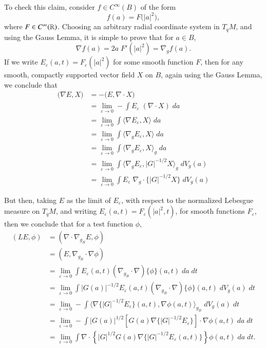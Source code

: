 To check this claim, consider $f \in C^\infty(B)$ of the form
%
\[ f(a) = F \Big( |a|^2 \Big), \]
%
where $F \in C^\infty(\operatorname{\mathbb{R}})$. Choosing an arbitrary radial coordinate system in $T_q M$, and using the Gauss Lemma, it is simple to prove that for $a \in B$,
%
\[ \nabla f(a) = 2a\; F'(|a|^2) = \nabla_g f(a). \]
%
If we write $E_\varepsilon(a,t) = F_\varepsilon(|a|^2)$ for some smooth function $F$, then for any smooth, compactly supported vector field $X$ on $B$, again using the Gauss Lemma, we conclude that
%
\begin{align*}
    \Big( \nabla E , X \Big) &= - \Big(  E , \nabla \cdot X \Big)\\
    &= \lim_{\varepsilon \to 0} - \int E_\varepsilon\; (\nabla \cdot X)\; da\\
    &= \lim_{\varepsilon \to 0} \int \Big\langle \nabla E_\varepsilon, X \Big\rangle\; da\\
    &= \lim_{\varepsilon \to 0} \int \Big\langle \nabla_g E_\varepsilon, X \Big\rangle\; da\\
    &= \lim_{\varepsilon \to 0} \int \Big\langle \nabla_g E_\varepsilon, X \Big\rangle_g\; da\\
    &= \lim_{\varepsilon \to 0} \int \Big\langle \nabla_g E_\varepsilon, |G|^{-1/2} X \Big\rangle_g\; dV_g(a)\\
    &= \lim_{\varepsilon \to 0} \int E_\varepsilon\; \nabla_g \cdot \{ |G|^{-1/2} X \}\; dV_g(a)
\end{align*}



But then, taking $E$ as the limit of $E_\varepsilon$, with respect to the normalized Lebesgue measure on $T_qM$, and writing $E_\varepsilon(a,t) = F_\varepsilon(|a|^2, t)$, for smooth functions $F_\varepsilon$, then we conclude that for a test function $\phi$,
%
\begin{align*}
    (L E, \phi) &= (\nabla \cdot \nabla_{g_B} E, \phi)\\
    &= (E, \nabla_{g_B} \cdot \nabla \phi)\\
    &= \lim_{\varepsilon \to 0} \int E_\varepsilon(a,t) (\nabla_{g_B} \cdot \nabla) \{ \phi \}(a,t)\; da\; dt\\
    &= \lim_{\varepsilon \to 0} \int |G(a)|^{-1/2} E_\varepsilon(a,t) (\nabla_{g_B} \cdot \nabla) \{ \phi \}(a,t)\; dV_g(a)\; dt\\
    &= \lim_{\varepsilon \to 0} - \int \langle \nabla \{ |G|^{-1/2} E_\varepsilon \}(a,t), \nabla \phi(a,t) \rangle_{g_B}\; dV_g(a)\; dt\\
    &= \lim_{\varepsilon \to 0} - \int |G(a)|^{1/2} [ G(a) \nabla \{ |G|^{-1/2} E_\varepsilon \} ] \cdot \nabla \phi(a,t)\; da\; dt\\
    &= \lim_{\varepsilon \to 0} \int \nabla \cdot \left\{ |G|^{1/2} G(a) \nabla \{ |G|^{-1/2} E_\varepsilon(a,t) \} \right\} \phi(a,t)\; da\; dt.
\end{align*}

